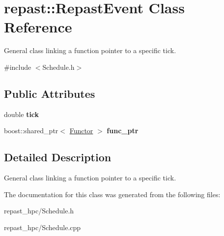 \hypertarget{classrepast_1_1_repast_event}{\section{repast\-:\-:Repast\-Event Class Reference}
\label{classrepast_1_1_repast_event}
}


General class linking a function pointer to a specific tick.  




{\ttfamily \#include $<$Schedule.\-h$>$}

\subsection*{Public Attributes}
\begin{DoxyCompactItemize}
\item 
\hypertarget{classrepast_1_1_repast_event_ac5266fa3c8de0f952b07652149028068}{double {\bfseries tick}}\label{classrepast_1_1_repast_event_ac5266fa3c8de0f952b07652149028068}

\item 
\hypertarget{classrepast_1_1_repast_event_add470a280d1a34ec9bced03f93df2c65}{boost\-::shared\-\_\-ptr$<$ \hyperlink{classrepast_1_1_functor}{Functor} $>$ {\bfseries func\-\_\-ptr}}\label{classrepast_1_1_repast_event_add470a280d1a34ec9bced03f93df2c65}

\end{DoxyCompactItemize}


\subsection{Detailed Description}
General class linking a function pointer to a specific tick. 

The documentation for this class was generated from the following files\-:\begin{DoxyCompactItemize}
\item 
repast\-\_\-hpc/Schedule.\-h\item 
repast\-\_\-hpc/Schedule.\-cpp\end{DoxyCompactItemize}
